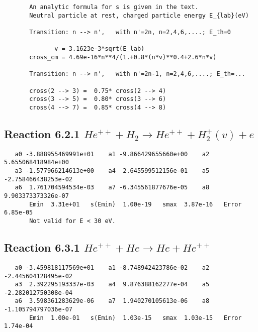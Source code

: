 \documentclass[12pt]{article}
\begin{document}
\begin{small}\begin{verbatim}
       An analytic formula for s is given in the text.
       Neutral particle at rest, charged particle energy E_{lab}(eV)

       Transition: n --> n',   with n'=2n, n=2,4,6,....; E_th=0

              v = 3.1623e-3*sqrt(E_lab)
       cross_cm = 4.69e-16*n**4/(1.+0.8*(n*v)**0.4+2.6*n*v)

       Transition: n --> n',   with n'=2n-1, n=2,4,6,....; E_th=...

       cross(2 --> 3) =  0.75* cross(2 --> 4)
       cross(3 --> 5) =  0.80* cross(3 --> 6)
       cross(4 --> 7) =  0.85* cross(4 --> 8)
\end{verbatim}\end{small}

\newpage
\subsection{
Reaction 6.2.1 $   He^{++} + H_2 \rightarrow He^{++} + H_2^+(v) + e$}


\begin{small}\begin{verbatim}
   a0 -3.888955469991e+01    a1 -9.866429655660e+00    a2  5.655068418984e+00
   a3 -1.577966214613e+00    a4  2.645599512156e-01    a5 -2.758466438253e-02
   a6  1.761704594534e-03    a7 -6.345561877676e-05    a8  9.903373373326e-07
       Emin  3.31e+01   s(Emin)  1.00e-19   smax  3.87e-16   Error  6.85e-05
       Not valid for E < 30 eV.
\end{verbatim}\end{small}




                              


\newpage
\subsection{
Reaction 6.3.1 $   He^{++} + He \rightarrow He + He^{++}$}


\begin{small}\begin{verbatim}
   a0 -3.459818117569e+01    a1 -8.748942423786e-02    a2 -2.445604128495e-02
   a3  2.392295193337e-03    a4  9.876388162277e-04    a5 -2.282012750308e-04
   a6  3.598361283629e-06    a7  1.940270105613e-06    a8 -1.105794797036e-07
       Emin  1.00e-01   s(Emin)  1.03e-15   smax  1.03e-15   Error  1.74e-04
\end{verbatim}\end{small}
\end{document}
